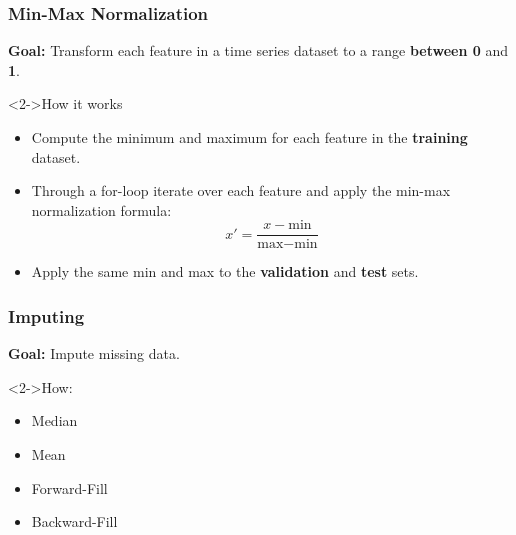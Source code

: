\documentclass[t,english]{beamer}
\begin{document}
\begin{frame}
  \frametitle{Min-Max Normalization}
  \textbf{Goal:} Transform each feature in a time series dataset to a range \textbf{between 0} and \textbf{1}.

  \begin{block}<2->{How it works}
    \begin{itemize}
      \item<2-> Compute the minimum and maximum for each feature in the \textbf{training} dataset.
      \item<3-> Through a for-loop iterate over each feature and apply the min-max normalization formula:
            \begin{equation}
              x' = \frac{x - \text{min}}{\text{max} - \text{min}}
            \end{equation}
      \item<4-> Apply the same min and max to the \textbf{validation} and \textbf{test} sets.
    \end{itemize}
  \end{block}
\end{frame}

\begin{frame}
    \frametitle{Imputing}
      \textbf{Goal:} Impute missing data.

    \begin{block}<2->{How:}
        \begin{itemize}
        \item<2-> Median
        \item <3-> Mean
        \item <4-> Forward-Fill
        \item <5-> Backward-Fill
        \end{itemize}
    \end{block}
\end{frame}
\end{document}
